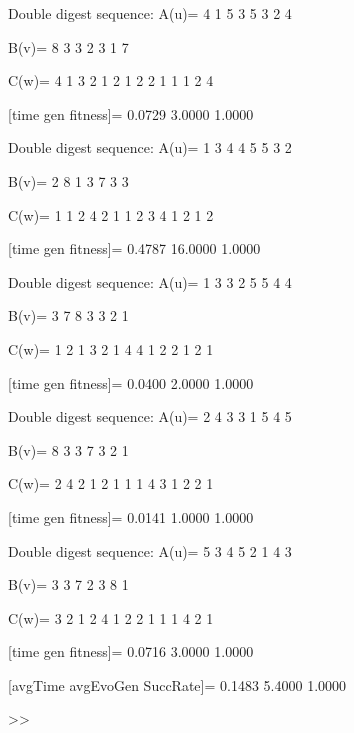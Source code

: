 Double digest sequence:
A(u)=
     4     1     5     3     5     3     2     4

B(v)=
     8     3     3     2     3     1     7

C(w)=
     4     1     3     2     1     2     1     2     2     1     1     1     2     4

[time gen fitness]=
    0.0729    3.0000    1.0000

Double digest sequence:
A(u)=
     1     3     4     4     5     5     3     2

B(v)=
     2     8     1     3     7     3     3

C(w)=
     1     1     2     4     2     1     1     2     3     4     1     2     1     2

[time gen fitness]=
    0.4787   16.0000    1.0000

Double digest sequence:
A(u)=
     1     3     3     2     5     5     4     4

B(v)=
     3     7     8     3     3     2     1

C(w)=
     1     2     1     3     2     1     4     4     1     2     2     1     2     1

[time gen fitness]=
    0.0400    2.0000    1.0000

Double digest sequence:
A(u)=
     2     4     3     3     1     5     4     5

B(v)=
     8     3     3     7     3     2     1

C(w)=
     2     4     2     1     2     1     1     1     4     3     1     2     2     1

[time gen fitness]=
    0.0141    1.0000    1.0000

Double digest sequence:
A(u)=
     5     3     4     5     2     1     4     3

B(v)=
     3     3     7     2     3     8     1

C(w)=
     3     2     1     2     4     1     2     2     1     1     1     4     2     1

[time gen fitness]=
    0.0716    3.0000    1.0000

[avgTime  avgEvoGen  SuccRate]=
    0.1483    5.4000    1.0000

>> 